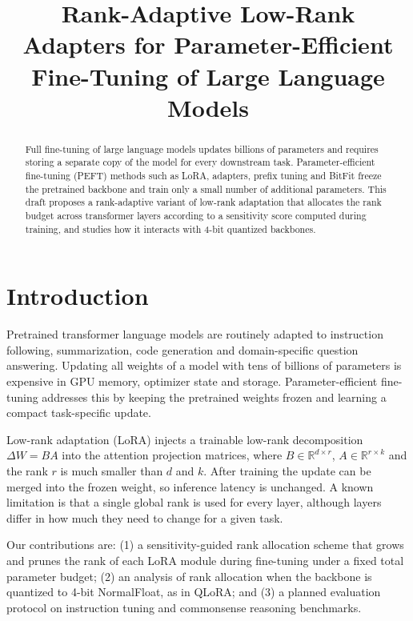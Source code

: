 \documentclass{article}
\title{Rank-Adaptive Low-Rank Adapters for Parameter-Efficient Fine-Tuning of Large Language Models}
\begin{document}
\maketitle

\begin{abstract}
Full fine-tuning of large language models updates billions of parameters and
requires storing a separate copy of the model for every downstream task.
Parameter-efficient fine-tuning (PEFT) methods such as LoRA, adapters, prefix
tuning and BitFit freeze the pretrained backbone and train only a small number
of additional parameters. This draft proposes a rank-adaptive variant of
low-rank adaptation that allocates the rank budget across transformer layers
according to a sensitivity score computed during training, and studies how it
interacts with 4-bit quantized backbones.
\end{abstract}

\section{Introduction}
Pretrained transformer language models are routinely adapted to instruction
following, summarization, code generation and domain-specific question
answering. Updating all weights of a model with tens of billions of parameters
is expensive in GPU memory, optimizer state and storage. Parameter-efficient
fine-tuning addresses this by keeping the pretrained weights frozen and
learning a compact task-specific update.

Low-rank adaptation (LoRA) injects a trainable low-rank decomposition
$\Delta W = BA$ into the attention projection matrices, where
$B \in \mathbb{R}^{d \times r}$, $A \in \mathbb{R}^{r \times k}$ and the rank
$r$ is much smaller than $d$ and $k$. After training the update can be merged
into the frozen weight, so inference latency is unchanged. A known limitation
is that a single global rank is used for every layer, although layers differ
in how much they need to change for a given task.

Our contributions are: (1) a sensitivity-guided rank allocation scheme that
grows and prunes the rank of each LoRA module during fine-tuning under a fixed
total parameter budget; (2) an analysis of rank allocation when the backbone is
quantized to 4-bit NormalFloat, as in QLoRA; and (3) a planned evaluation
protocol on instruction tuning and commonsense reasoning benchmarks.
\end{document}
